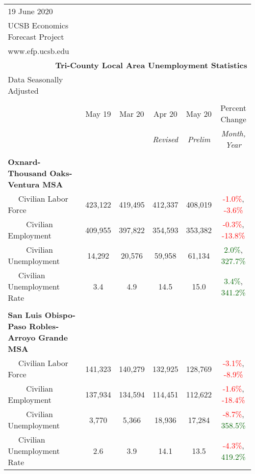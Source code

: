 \documentclass[12pt]{article}
\begin{document}
\begin{landscape}
\begin{table}
\begin{tabular}{|l|c|c|c|c|c|}
\multicolumn{1}{l}{\small 19 June 2020} & \multicolumn{5}{c}{} \\
\multicolumn{1}{l}{\small UCSB Economics Forecast Project} & \multicolumn{5}{c}{} \\
\multicolumn{1}{l}{\small www.efp.ucsb.edu} & \multicolumn{5}{c}{} \\
\multicolumn{6}{r}{\large \textbf{Tri-County Local Area Unemployment Statistics}} \\
\multicolumn{1}{l}{\small Data Seasonally Adjusted} & \multicolumn{5}{c}{} \\ \hline \hline
& & & & & \\
 & May 19 & Mar 20 & Apr 20 & May 20 & Percent Change \\
 & & & \small \textit{Revised} & \small \textit{Prelim} & \small \textit{Month, Year} \\ \hline
&&&&& \\
\textbf{Oxnard-Thousand Oaks-Ventura MSA} &&&&& \\
$\quad$ Civilian Labor Force &423,122 & 419,495 & 412,337 & 408,019 & \textcolor{red}{-1.0\%}, \textcolor{red}{-3.6\%} \\
$\qquad$ \small Civilian Employment &409,955 & 397,822 & 354,593 & 353,382 & \textcolor{red}{-0.3\%}, \textcolor{red}{-13.8\%} \\
$\qquad$ \small Civilian Unemployment &14,292 & 20,576 & 59,958 & 61,134 & \textcolor{darkgreen}{2.0\%}, \textcolor{darkgreen}{327.7\%} \\
$\quad$ Civilian Unemployment Rate &3.4 & 4.9 & 14.5 & 15.0 & \textcolor{darkgreen}{3.4\%}, \textcolor{darkgreen}{341.2\%} \\
&&&&& \\
\textbf{San Luis Obispo-Paso Robles-Arroyo Grande MSA} &&&&& \\
$\quad$ Civilian Labor Force &141,323 & 140,279 & 132,925 & 128,769 & \textcolor{red}{-3.1\%}, \textcolor{red}{-8.9\%} \\
$\qquad$ \small Civilian Employment &137,934 & 134,594 & 114,451 & 112,622 & \textcolor{red}{-1.6\%}, \textcolor{red}{-18.4\%} \\
$\qquad$ \small Civilian Unemployment &3,770 & 5,366 & 18,936 & 17,284 & \textcolor{red}{-8.7\%}, \textcolor{darkgreen}{358.5\%} \\
$\quad$ Civilian Unemployment Rate &2.6 & 3.9 & 14.1 & 13.5 & \textcolor{red}{-4.3\%}, \textcolor{darkgreen}{419.2\%} \\

\end{tabular}
\end{table}
\end{landscape}
\end{document}
